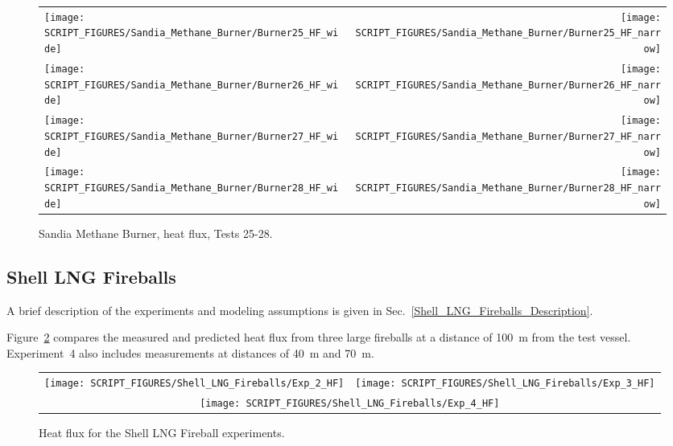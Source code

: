 \begin{figure}[p]
\begin{tabular*}{\textwidth}{l@{\extracolsep{\fill}}r}
\texttt{[image: SCRIPT\_FIGURES/Sandia\_Methane\_Burner/Burner25\_HF\_wide]} &
\texttt{[image: SCRIPT\_FIGURES/Sandia\_Methane\_Burner/Burner25\_HF\_narrow]} \\
\texttt{[image: SCRIPT\_FIGURES/Sandia\_Methane\_Burner/Burner26\_HF\_wide]} &
\texttt{[image: SCRIPT\_FIGURES/Sandia\_Methane\_Burner/Burner26\_HF\_narrow]} \\
\texttt{[image: SCRIPT\_FIGURES/Sandia\_Methane\_Burner/Burner27\_HF\_wide]} &
\texttt{[image: SCRIPT\_FIGURES/Sandia\_Methane\_Burner/Burner27\_HF\_narrow]} \\
\texttt{[image: SCRIPT\_FIGURES/Sandia\_Methane\_Burner/Burner28\_HF\_wide]} &
\texttt{[image: SCRIPT\_FIGURES/Sandia\_Methane\_Burner/Burner28\_HF\_narrow]}
\end{tabular*}
\caption[Sandia Methane Burner, heat flux, Tests 25-28] {Sandia Methane Burner, heat flux, Tests 25-28.}
\label{Sandia_Methane_Burner_HF_7}
\end{figure}

\clearpage

\subsection{Shell LNG Fireballs}
\label{Shell_LNG_Fireballs_Heat_Flux}

A brief description of the experiments and modeling assumptions is given in Sec.~\ref{Shell_LNG_Fireballs_Description}. 

Figure~\ref{Shell_HF} compares the measured and predicted heat flux from three large fireballs at a distance of 100~m from the test vessel. Experiment~4 also includes measurements at distances of 40~m and 70~m.

\begin{figure}[!ht]
\begin{tabular*}{\textwidth}{l@{\extracolsep{\fill}}r}
\texttt{[image: SCRIPT\_FIGURES/Shell\_LNG\_Fireballs/Exp\_2\_HF]} &
\texttt{[image: SCRIPT\_FIGURES/Shell\_LNG\_Fireballs/Exp\_3\_HF]} \\
\multicolumn{2}{c}{\texttt{[image: SCRIPT\_FIGURES/Shell\_LNG\_Fireballs/Exp\_4\_HF]}} 
\end{tabular*}
\caption[Shell LNG Fireballs, heat flux] {Heat flux for the Shell LNG Fireball experiments.}
\label{Shell_HF}
\end{figure}


